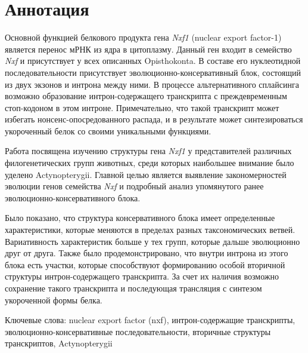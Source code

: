 \clearpage
\section{Аннотация}

Основной функцией белкового продукта гена \textit{Nxf1} (nuclear export factor-1) является перенос мРНК из ядра в цитоплазму. Данный ген входит в семейство \textit{Nxf} и присутствует у всех описанных Opisthokonta. В составе его нуклеотидной последовательности присутствует эволюционно-консервативный блок, состоящий из двух экзонов и интрона между ними. В процессе альтернативного сплайсинга возможно образование интрон-содержащего транскрипта с преждевременным стоп-кодоном в этом интроне. Примечательно, что такой транскрипт может избегать нонсенс-опосредованного распада, и в результате может синтезироваться укороченный белок со своими уникальными функциями.

Работа посвящена изучению структуры гена \textit{Nxf1} у представителей различных филогенетических групп животных, среди которых наибольшее внимание было уделено Actynopterygii. Главной целью является выявление закономерностей эволюции генов семейства \textit{Nxf} и подробный анализ упомянутого ранее эволюционно-консервативного блока.

Было показано, что структура консервативного блока имеет определенные характеристики, которые меняются в пределах разных таксономических ветвей. Вариативность характеристик больше у тех групп, которые дальше эволюционно друг от друга. Также было продемонстрировано, что внутри интрона из этого блока есть участки, которые способствуют формированию особой вторичной структуры интрон-содержащего транскрипта. За счет их наличия возможно сохранение такого транскрипта и последующая трансляция с синтезом укороченной формы белка.

\vspace{1em}

Ключевые слова: nuclear export factor (nxf), интрон-содержащие транскрипты, эволюционно-консервативные последовательности, вторичные структуры транскриптов, Actynopterygii